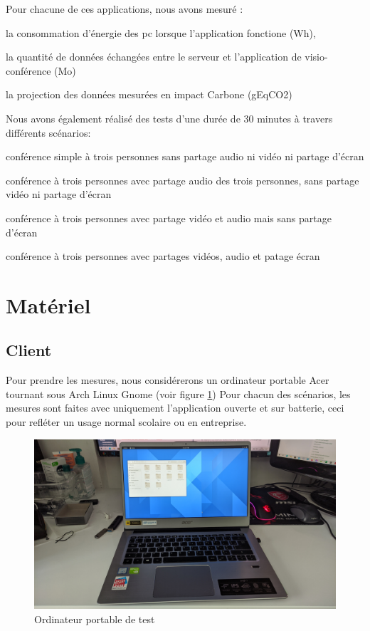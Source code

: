 \documentclass[11pt,a4paper]{report}
\begin{document}
Pour chacune de ces applications, nous avons mesuré :
\bi \item la consommation d’énergie des pc lorsque l'application fonctione (Wh),
\item la quantité de données échangées entre le serveur et l'application de visio-conférence (Mo)
\item la projection des données mesurées en impact Carbone (gEqCO2)
\ei

Nous avons également réalisé des tests d'une durée de 30 minutes à travers différents scénarios:
\bi \item conférence simple à trois personnes sans partage audio ni vidéo ni partage d'écran 
\item conférence à trois personnes avec partage audio des trois personnes, sans partage vidéo ni partage d'écran
\item conférence à trois personnes avec partage vidéo et audio mais sans partage d'écran
\item conférence à trois personnes avec partages vidéos, audio et patage écran \ei 

\section{Matériel}
\subsection{Client}
Pour prendre les mesures, nous considérerons un ordinateur portable Acer tournant sous Arch Linux Gnome (voir figure \ref{fig:test}) Pour chacun des scénarios, les mesures sont faites avec uniquement l'application ouverte et sur batterie, ceci pour refléter un usage normal scolaire ou en entreprise.
\begin{figure}[!h]
    \centering
    \includegraphics[scale=0.1]{ordinateur.jpg}
    \caption{Ordinateur portable de test}
     \label{fig:test}
\end{figure}
\end{document}

